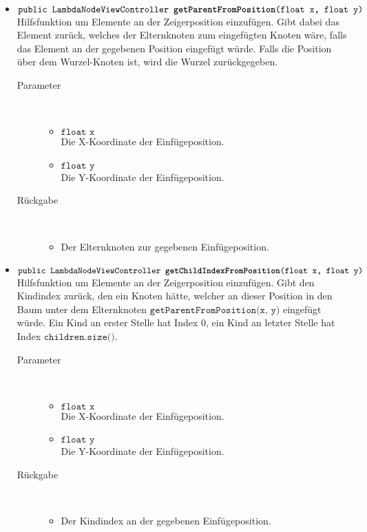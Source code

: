 \begin{description}
\begin{itemize}
		\item $\texttt{public LambdaNodeViewController \textbf{getParentFromPosition}(float x, float y)}$ \\ Hilfsfunktion um Elemente an der Zeigerposition einzufügen. Gibt dabei das Element zurück, welches der Elternknoten zum eingefügten Knoten wäre, falls das Element an der gegebenen Position eingefügt würde. Falls die Position über dem Wurzel-Knoten ist, wird die Wurzel zurückgegeben.
		\begin{description}
			\item[Parameter] \hfill \\
			\vspace{-.8cm}
			\begin{itemize}
				\item $\texttt{float x}$ \\ Die X-Koordinate der Einfügeposition.
				\item $\texttt{float y}$ \\ Die Y-Koordinate der Einfügeposition.
			\end{itemize}
			\item[Rückgabe] \hfill \\
			\vspace{-.8cm}
			\begin{itemize}
				\item Der Elternknoten zur gegebenen Einfügeposition.
			\end{itemize}
		\end{description}
		
		\item $\texttt{public LambdaNodeViewController \textbf{getChildIndexFromPosition}(float x, float y)}$ \\ Hilfsfunktion um Elemente an der Zeigerposition einzufügen. Gibt den Kindindex zurück, den ein Knoten hätte, welcher an dieser Position in den Baum unter dem Elternknoten $\texttt{getParentFromPosition(x, y)}$ eingefügt würde. Ein Kind an erster Stelle hat Index 0, ein Kind an letzter Stelle hat Index $\texttt{children.size()}$.
		\begin{description}
			\item[Parameter] \hfill \\
			\vspace{-.8cm}
			\begin{itemize}
				\item $\texttt{float x}$ \\ Die X-Koordinate der Einfügeposition.
				\item $\texttt{float y}$ \\ Die Y-Koordinate der Einfügeposition.
			\end{itemize}
			\item[Rückgabe] \hfill \\
			\vspace{-.8cm}
			\begin{itemize}
				\item Der Kindindex an der gegebenen Einfügeposition.
			\end{itemize}
		\end{description}
		

\end{itemize}
\end{description}
